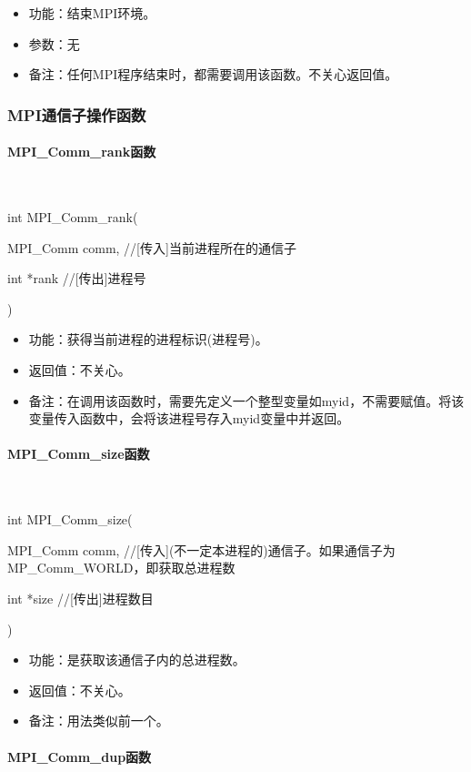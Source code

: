 \documentclass[UTF8]{article}%
\begin{document}
\begin{itemize}
    \item 功能：结束MPI环境。
    \item 参数：无
    \item 备注：任何MPI程序结束时，都需要调用该函数。不关心返回值。
\end{itemize}

\subsubsection{MPI通信子操作函数}

\paragraph{MPI\_Comm\_rank函数}~{}

int MPI\_Comm\_rank(

    \qquad MPI\_Comm comm, //[传入]当前进程所在的通信子

    \qquad int *rank //[传出]进程号

    ) 

\begin{itemize}
    \item 功能：获得当前进程的进程标识(进程号)。
    \item 返回值：不关心。
    \item 备注：在调用该函数时，需要先定义一个整型变量如myid，不需要赋值。将该变量传入函数中，会将该进程号存入myid变量中并返回。
\end{itemize}

\paragraph{MPI\_Comm\_size函数}~{}

int MPI\_Comm\_size(
    
    \qquad MPI\_Comm comm, //[传入](不一定本进程的)通信子。如果通信子为MP\_Comm\_WORLD，即获取总进程数

    \qquad int *size //[传出]进程数目
    
    ) 

\begin{itemize}
    \item 功能：是获取该通信子内的总进程数。
    \item 返回值：不关心。
    \item 备注：用法类似前一个。
\end{itemize}

\paragraph{MPI\_Comm\_dup函数}~{}
\end{document}
